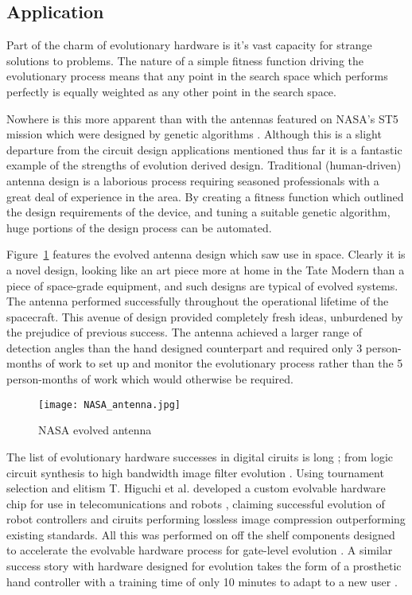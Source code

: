 \subsection{Application}

Part of the charm of evolutionary hardware is it's vast capacity for strange
solutions
to problems. The nature of a simple fitness function driving the evolutionary
process means that any point in the search space which performs perfectly is
equally weighted as any other point in the search space.

Nowhere is this more apparent than with the antennas featured on NASA's ST5 mission
which were designed by genetic algorithms \cite{Antenna}. Although
this is a slight departure from the circuit design applications mentioned thus
far it is a fantastic example of the strengths of evolution derived design.
Traditional (human-driven) antenna design is a laborious process requiring
seasoned professionals with a great deal of experience in the area. By creating
a fitness function which outlined the design requirements of the device, and
tuning a suitable genetic algorithm, huge portions of the design process can
be automated.

Figure~\ref{fig:antenna} features the evolved antenna design which
saw use in space. Clearly it is a novel design, looking like an art piece
more at home in the Tate Modern than a piece of space-grade equipment, and such
designs are typical of evolved systems. The antenna performed successfully
throughout the operational lifetime of the spacecraft. This avenue of design
provided completely fresh ideas, unburdened by the prejudice of previous
success. The antenna achieved a larger range of detection angles than the
hand designed counterpart and required only 3 person-months of work to set up and
monitor the evolutionary process rather than the 5 person-months of work which
would otherwise be required.

\begin{figure}
	\centering
	\texttt{[image: NASA\_antenna.jpg]}
	\caption{NASA evolved antenna \cite{Antenna}}
	\label{fig:antenna}
\end{figure}

The list of evolutionary hardware successes in digital ciruits is long \cite{Sekanina};
from logic circuit synthesis \cite{Vasicek2011} to high bandwidth image filter
evolution \cite{10.1007/3-540-46004-7_26}\cite{HybridFilter}.
Using tournament selection and elitism T. Higuchi et al.
developed a custom evolvable hardware chip for use in telecomunications and robots \cite{HiguchiRW},
claiming successful evolution of robot controllers and ciruits performing lossless image
compression outperforming existing standards. All this was performed on off
the shelf components designed to accelerate the evolvable hardware process
for gate-level evolution \cite{HiguchiRW}. A similar success story with hardware
designed for evolution takes the form of a prosthetic hand controller with
a training time of only 10 minutes to adapt to a new user \cite{Kajitani1999AnEH}.

